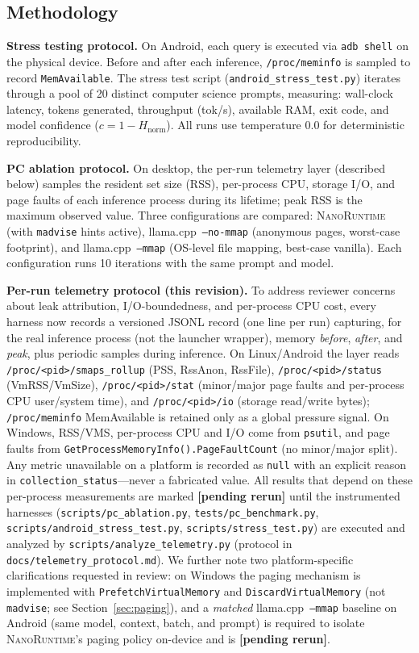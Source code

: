 \documentclass[11pt]{article}
\newcommand{\nanort}{\textsc{NanoRuntime}}
\begin{document}
\subsection{Methodology}
\label{sec:methodology}

\textbf{Stress testing protocol.} On Android, each query is executed via
\texttt{adb shell} on the physical device. Before and after each inference,
\texttt{/proc/meminfo} is sampled to record \texttt{MemAvailable}.
The stress test script (\texttt{android\_stress\_test.py}) iterates through
a pool of 20 distinct computer science prompts, measuring: wall-clock
latency, tokens generated, throughput (tok/s), available RAM, exit code,
and model confidence ($c = 1 - H_{\text{norm}}$). All runs use temperature
0.0 for deterministic reproducibility.

\textbf{PC ablation protocol.} On desktop, the per-run telemetry layer
(described below) samples the resident set size (RSS), per-process CPU, storage
I/O, and page faults of each inference process during its lifetime; peak RSS is
the maximum observed value. Three configurations are compared: \nanort{} (with
\texttt{madvise} hints active), llama.cpp~\texttt{--no-mmap} (anonymous pages,
worst-case footprint), and llama.cpp~\texttt{--mmap} (OS-level file mapping,
best-case vanilla). Each configuration runs 10 iterations with the same prompt
and model.

\textbf{Per-run telemetry protocol (this revision).} To address reviewer
concerns about leak attribution, I/O-boundedness, and per-process CPU cost,
every harness now records a versioned JSONL record (one line per run) capturing,
for the real inference process (not the launcher wrapper), memory
\emph{before}, \emph{after}, and \emph{peak}, plus periodic samples during
inference. On Linux/Android the layer reads
\texttt{/proc/<pid>/smaps\_rollup} (PSS, RssAnon, RssFile),
\texttt{/proc/<pid>/status} (VmRSS/VmSize), \texttt{/proc/<pid>/stat}
(minor/major page faults and per-process CPU user/system time), and
\texttt{/proc/<pid>/io} (storage read/write bytes); \texttt{/proc/meminfo}
MemAvailable is retained only as a global pressure signal. On Windows, RSS/VMS,
per-process CPU and I/O come from \texttt{psutil}, and page faults from
\texttt{GetProcessMemoryInfo().PageFaultCount} (no minor/major split). Any
metric unavailable on a platform is recorded as \texttt{null} with an explicit
reason in \texttt{collection\_status}---never a fabricated value. All results
that depend on these per-process measurements are marked
\textbf{[pending rerun]} until the instrumented harnesses
(\texttt{scripts/pc\_ablation.py}, \texttt{tests/pc\_benchmark.py},
\texttt{scripts/android\_stress\_test.py}, \texttt{scripts/stress\_test.py})
are executed and analyzed by \texttt{scripts/analyze\_telemetry.py}
(protocol in \texttt{docs/telemetry\_protocol.md}). We further note two
platform-specific clarifications requested in review: on Windows the paging
mechanism is implemented with \texttt{PrefetchVirtualMemory} and
\texttt{DiscardVirtualMemory} (not \texttt{madvise}; see
Section~\ref{sec:paging}), and a \emph{matched} llama.cpp~\texttt{--mmap}
baseline on Android (same model, context, batch, and prompt) is required to
isolate \nanort{}'s paging policy on-device and is \textbf{[pending rerun]}.
\end{document}
